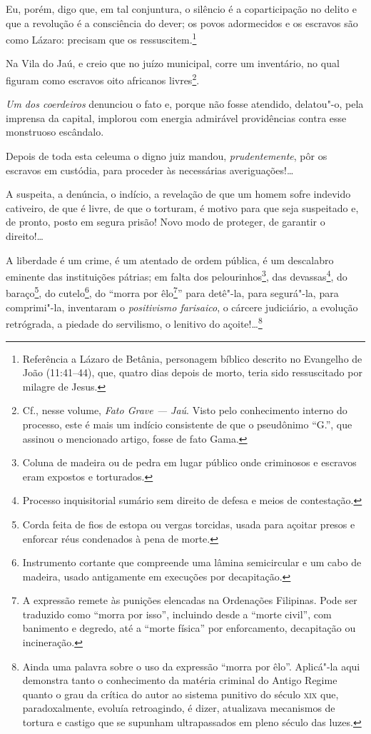 Eu, porém, digo que, em tal conjuntura, o silêncio é a coparticipação no
delito e que a revolução é a consciência do dever; os povos adormecidos
e os escravos são como Lázaro: precisam que os ressuscitem.\footnote{
  Referência a Lázaro de Betânia, personagem bíblico descrito no
  Evangelho de João (11:41--44), que, quatro dias depois de morto, teria
  sido ressuscitado por milagre de Jesus.}

Na Vila do Jaú, e creio que no juízo municipal, corre um inventário, no
qual figuram como escravos oito africanos livres\footnote{Cf., nesse
  volume, \emph{Fato Grave --- Jaú}. Visto pelo conhecimento
  interno do processo, este é mais um indício consistente de que o
  pseudônimo ``G.'', que assinou o mencionado artigo, fosse de fato Gama.}.

\emph{Um dos coerdeiros} denunciou o fato e, porque não fosse atendido,
delatou"-o, pela imprensa da capital, implorou com energia admirável
providências contra esse monstruoso escândalo.

Depois de toda esta celeuma o digno juiz mandou, \emph{prudentemente},
pôr os escravos em custódia, para proceder às necessárias
averiguações!\ldots{}

A suspeita, a denúncia, o indício, a revelação de que um homem sofre
indevido cativeiro, de que é livre, de que o torturam, é motivo para que
seja suspeitado e, de pronto, posto em segura prisão! Novo modo de
proteger, de garantir o direito!\ldots{}

A liberdade é um crime, é um atentado de ordem pública, é um descalabro
eminente das instituições pátrias; em falta dos pelourinhos\footnote{
  Coluna de madeira ou de pedra em lugar público onde criminosos e
  escravos eram expostos e torturados.}, das devassas\footnote{
  Processo inquisitorial sumário sem direito de defesa e meios de
  contestação.}, do baraço\footnote{Corda feita de fios de estopa ou
  vergas torcidas, usada para açoitar presos e enforcar réus condenados
  à pena de morte.}, do cutelo\footnote{Instrumento cortante que
  compreende uma lâmina semicircular e um cabo de madeira, usado
  antigamente em execuções por decapitação.}, do ``morra por
êlo\footnote{A expressão remete às punições elencadas na Ordenações
  Filipinas. Pode ser traduzido como ``morra por isso'', incluindo desde a
  ``morte civil'', com banimento e degredo, até a ``morte física'' por
  enforcamento, decapitação ou incineração.}'' para detê"-la, para
segurá"-la, para comprimi"-la, inventaram o \emph{positivismo farisaico},
o cárcere judiciário, a evolução retrógrada, a piedade do servilismo, o
lenitivo do açoite!\ldots{}\footnote{Ainda uma palavra sobre o uso
  da expressão ``morra por êlo''. Aplicá"-la aqui demonstra tanto o
  conhecimento da matéria criminal do Antigo Regime quanto o grau da
  crítica do autor ao sistema punitivo do século \textsc{xix} que,
  paradoxalmente, evoluía retroagindo, é dizer, atualizava mecanismos de
  tortura e castigo que se supunham ultrapassados em pleno século das
  luzes.}

